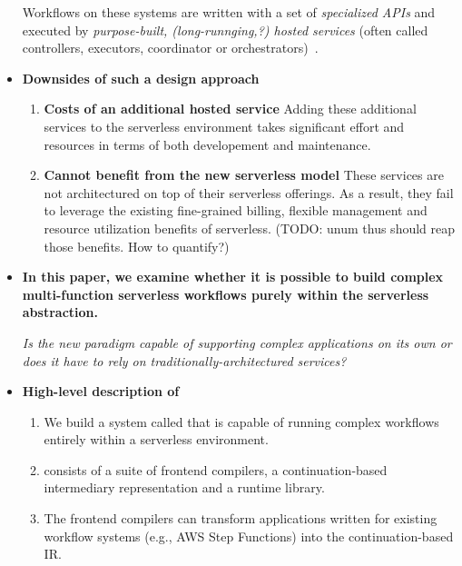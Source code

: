 \begin{itemize}
  Workflows on these systems are written with a set of \emph{specialized APIs}
  and executed by \emph{purpose-built, (long-runnging,?) hosted services}
  (often called controllers, executors, coordinator or
  orchestrators)~\cite{gg-atc, excamera, kappa, triggerflow, pywren,
  durable-functions, aws-step-functions, google-cloud-composer,
  google-workflows}.

  \item \textbf{Downsides of such a design approach}

    \begin{enumerate}
      \item \textbf{Costs of an additional hosted service} Adding these
      additional services to the serverless environment takes significant
      effort and resources in terms of both developement and maintenance.

      \item \textbf{Cannot benefit from the new serverless model} These
      services are not architectured on top of their serverless offerings. As
      a result, they fail to leverage the existing fine-grained billing,
      flexible management and resource utilization benefits of serverless.
      (TODO: unum thus should reap those benefits. How to quantify?)
    \end{enumerate}


  \item \textbf{In this paper, we examine whether it is possible to build
  complex multi-function serverless workflows purely within the serverless
  abstraction.}

  \emph{Is the new paradigm capable of supporting complex applications on its
  own or does it have to rely on traditionally-architectured services?}

  \item \textbf{High-level description of \name{}}

    \begin{enumerate}

      \item We build a system called \name{} that is capable of running
      complex workflows entirely within a serverless environment.

      \item \name{} consists of a suite of frontend compilers, a
      continuation-based intermediary representation and a runtime library.

      \item The frontend compilers can transform applications written for
      existing workflow systems (e.g., AWS Step Functions) into the
      continuation-based
      \name{} IR.


\end{enumerate}
\end{itemize}
